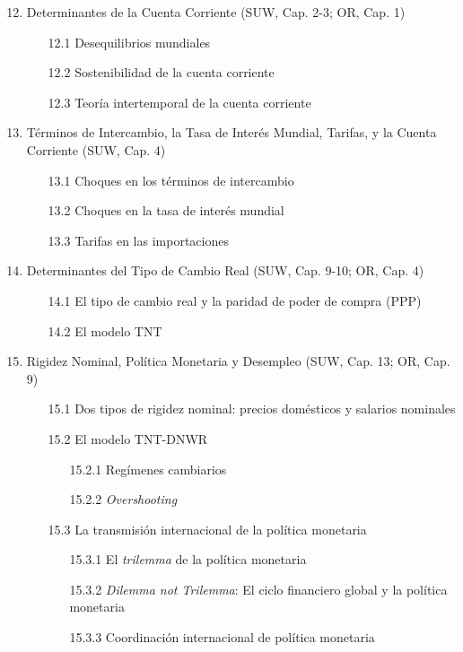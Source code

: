 \documentclass[12pt]{article}
\begin{document}
\begin{enumerate}
\setcounter{enumi}{11}
    \item Determinantes de la Cuenta Corriente (SUW, Cap. 2-3; OR, Cap. 1)
    \begin{enumerate}
    \item[12.1] Desequilibrios mundiales
    \item[12.2] Sostenibilidad de la cuenta corriente
    \item[12.3] Teoría intertemporal de la cuenta corriente
    \end{enumerate}
    \item Términos de Intercambio, la Tasa de Interés Mundial, Tarifas, y la Cuenta Corriente (SUW, Cap. 4)
    \begin{enumerate}
        \item[13.1] Choques en los términos de intercambio
        \item[13.2] Choques en la tasa de interés mundial
        \item[13.3] Tarifas en las importaciones
    \end{enumerate}
    \item Determinantes del Tipo de Cambio Real (SUW, Cap. 9-10; OR, Cap. 4)
    \begin{enumerate}
        \item[14.1] El tipo de cambio real y la paridad de poder de compra (PPP)
        \item[14.2] El modelo TNT
    \end{enumerate}
    \item Rigidez Nominal, Política Monetaria y Desempleo (SUW, Cap. 13; OR, Cap. 9)
    \begin{enumerate}
        \item[15.1] Dos tipos de rigidez nominal: precios domésticos y salarios nominales
        \item[15.2] El modelo TNT-DNWR
        \begin{enumerate}
            \item[15.2.1] Regímenes cambiarios
            \item[15.2.2] \textit{Overshooting}
        \end{enumerate}
        \item[15.3] La transmisión internacional de la política monetaria
        \begin{enumerate}
            \item[15.3.1] El \textit{trilemma} de la política monetaria
            \item[15.3.2] \textit{Dilemma not Trilemma}: El ciclo financiero global y la política monetaria
            \item[15.3.3] Coordinación internacional de política monetaria
        \end{enumerate}
    \end{enumerate}
\end{enumerate}
\end{document}
